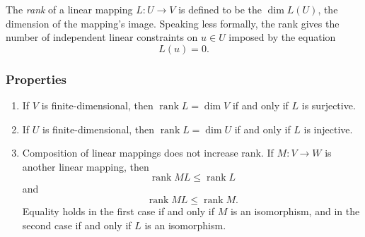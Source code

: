 \documentclass{article}
\newcommand{\rank}{\operatorname{rank}}
\begin{document}
The \emph{rank} of a linear mapping $L\colon U\to V$ is defined to be
the $\dim L(U)$, the dimension of the mapping's image.  Speaking less
formally, the rank gives the number of independent linear constraints
on $u\in U$ imposed by the equation
\[ L(u)=0. \]

\subsubsection*{Properties}
\begin{enumerate}
\item If $V$ is finite-dimensional, then $\rank L=\dim V$ if and only
  if $L$ is surjective.
\item If $U$ is finite-dimensional, then $\rank L=\dim U$ if and only
  if $L$ is injective.
\item Composition of linear mappings does not increase rank.  If
  $M\colon V\to W$ is another linear mapping, then \[\rank ML \le
  \rank L\] and
  \[\rank ML \le \rank M.\] Equality holds in the first case if
  and only if $M$ is an isomorphism, and in the second case if and
  only if $L$ is an isomorphism.
\end{enumerate}
\end{document}
